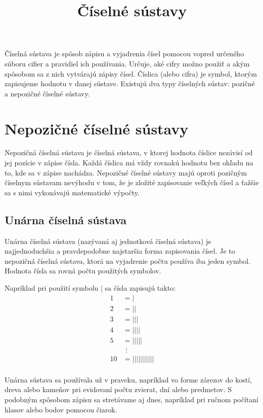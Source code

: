 \documentclass{article}
\title{Číselné sústavy}
\begin{document}
\maketitle

Číselná sústava je spôsob zápisu a vyjadrenia čísel pomocou vopred určeného súboru cifier a pravidiel ich používania. Určuje, aké cifry možno použiť a akým spôsobom sa z nich vytvárajú zápisy čísel. Číslica (alebo cifra) je symbol, ktorým zapisujeme hodnotu v danej sústave. Existujú dva typy číselných sústav: pozičné a nepozičné číselné sústavy.

\section{Nepozičné číselné sústavy}

Nepozičná číselná sústava je číselná sústava, v ktorej hodnota číslice nezávisí od jej pozície v zápise čísla. Každá číslica má vždy rovnakú hodnotu bez ohľadu na to, kde sa v zápise nachádza. Nepozičné číselné sústavy majú oproti pozičným číselnym sústavam nevýhodu v tom, že je zložité zapisovanie veľkých čísel a ťažšie sa s nimi vykonávajú matematické výpočty.

\subsection{Unárna číselná sústava}

Unárna číselná sústava (nazývaná aj jednotková číselná sústava) je najjednoduchšia a pravdepodobne najstaršia forma zapisovania čísel. Je to nepozičná číselná sústava, ktorá na vyjadrenie počtu používa iba jeden symbol. Hodnota čísla sa rovná počtu použitých symbolov.

Napríklad pri použití symbolu $\vert$ sa čísla zapisujú takto:
\[
\begin{aligned}
  1 &= \vert \\
  2 &= \vert \vert \\
  3 &= \vert \vert \vert \\ 
  4 &= \vert \vert \vert \vert \\
  5 &= \vert \vert \vert \vert \vert \\
  & \hspace{5pt} \vdots \\
  10 &= \vert \vert \vert \vert \vert \vert \vert \vert \vert \vert \vert \\
\end{aligned}
\]

Unárna sústava sa používala už v praveku, napríklad vo forme zárezov do kostí, dreva alebo kameňov pri evidovaní počtu zvierat, dní alebo predmetov. S podobným spôsobom zápisu sa stretávame aj dnes, napríklad pri ručnom počítaní hlasov alebo bodov pomocou čiarok.
\end{document}
